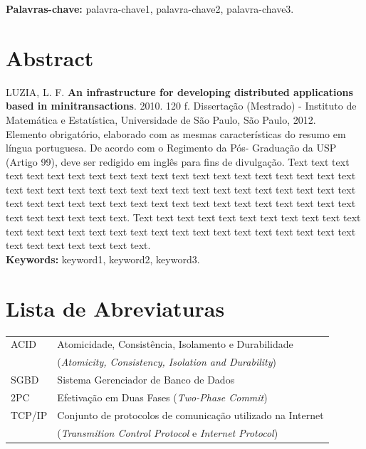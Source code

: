\documentclass[11pt,twoside,a4paper]{book}
\begin{document}
\noindent \textbf{Palavras-chave:} palavra-chave1, palavra-chave2, palavra-chave3.

\chapter*{Abstract}
\noindent LUZIA, L. F. \textbf{An infrastructure for developing distributed applications based in minitransactions}. 
2010. 120 f.
Dissertação (Mestrado) - Instituto de Matemática e Estatística,
Universidade de São Paulo, São Paulo, 2012.
\\


Elemento obrigatório, elaborado com as mesmas características do resumo em
língua portuguesa. De acordo com o Regimento da Pós- Graduação da USP (Artigo
99), deve ser redigido em inglês para fins de divulgação. 
Text text text text text text text text text text text text text text text text
text text text text text text text text text text text text text text text text
text text text text text text text text text text text text text text text text
text text text text text text text text text text text text.
Text text text text text text text text text text text text text text text text
text text text text text text text text text text text text text text text text
text text text.
\\

\noindent \textbf{Keywords:} keyword1, keyword2, keyword3.

\tableofcontents

\chapter{Lista de Abreviaturas}
\begin{tabular}{ll}
	ACID		& Atomicidade, Consistência, Isolamento e Durabilidade \\
			& (\emph{Atomicity, Consistency, Isolation and Durability})\\
        SGBD	& Sistema Gerenciador de Banco de Dados\\
	2PC		& Efetivação em Duas Fases (\emph{Two-Phase Commit})\\
	TCP/IP	& Conjunto de protocolos de comunicação utilizado na Internet\\
			& (\emph{Transmition Control Protocol} e \emph{Internet Protocol})\\
\end{tabular}

\listoffigures
\listoftables
\listofalgorithms
\end{document}
